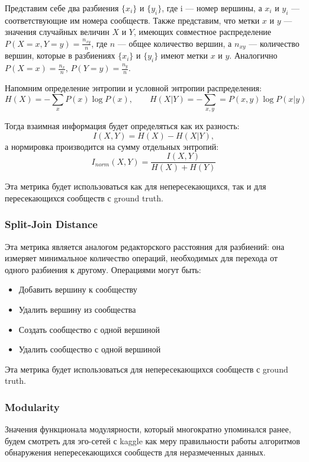 \documentclass[12pt]{article}
\begin{document}
Представим себе два разбиения $\{x_i\}$ и $\{y_i\}$, где i --- номер вершины, а $x_i$ и $y_i$ --- соответствующие им номера сообществ. Также представим, что метки $x$ и $y$ --- значения случайных величин $X$ и $Y$, имеющих совместное распределение $P(X = x, Y = y) = \frac{n_{xy}}{n}$, где $n$ --- общее количество вершин, а $n_{xy}$ --- количество вершин, которые в разбиениях $\{x_i\}$ и $\{y_i\}$ имеют метки $x$ и $y$. Аналогично $P(X = x) = \frac{n_{x}}{n}$, $P(Y = y) = \frac{n_{y}}{n}$. 

Напомним определение энтропии и условной энтропии распределения:
\[
H(X) = -\sum\limits_x P(x)\log P(x),\qquad H(X|Y) = -\sum\limits_{x, y} = P(x, y)\log P(x|y)
\]

Тогда взаимная информация будет определяться как их разность:
\[
I(X, Y) = H(X) - H(X|Y), 
\]
а нормировка производится на сумму отдельных энтропий:
\[
I_{norm}(X, Y) = \frac{I(X, Y)}{H(X) + H(Y)}
\]

Эта метрика будет использоваться как для непересекающихся, так и для пересекающихся сообществ с ground truth.

\subsubsection*{Split-Join Distance}

Эта метрика является аналогом редакторского расстояния для разбиений: она измеряет минимальное количество операций, необходимых для перехода от одного разбиения к другому. Операциями могут быть:
\begin{itemize}
\item Добавить вершину к сообществу
\item Удалить вершину из сообщества
\item Создать сообщество с одной вершиной
\item Удалить сообщество с одной вершиной
\end{itemize}

Эта метрика будет использоваться для непересекающихся сообществ с ground truth.

\subsubsection*{Modularity}

Значения функционала модулярности, который многократно упоминался ранее, будем смотреть для эго-сетей с kaggle как меру правильности работы алгоритмов обнаружения непересекающихся сообществ для неразмеченных данных.
\end{document}
